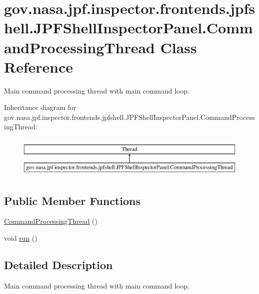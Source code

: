 \hypertarget{classgov_1_1nasa_1_1jpf_1_1inspector_1_1frontends_1_1jpfshell_1_1_j_p_f_shell_inspector_panel_1_1_command_processing_thread}{}\section{gov.\+nasa.\+jpf.\+inspector.\+frontends.\+jpfshell.\+J\+P\+F\+Shell\+Inspector\+Panel.\+Command\+Processing\+Thread Class Reference}
\label{classgov_1_1nasa_1_1jpf_1_1inspector_1_1frontends_1_1jpfshell_1_1_j_p_f_shell_inspector_panel_1_1_command_processing_thread}


Main command processing thread with main command loop.  


Inheritance diagram for gov.\+nasa.\+jpf.\+inspector.\+frontends.\+jpfshell.\+J\+P\+F\+Shell\+Inspector\+Panel.\+Command\+Processing\+Thread\+:\begin{figure}[H]
\begin{center}
\leavevmode
\includegraphics[height=2.000000cm]{classgov_1_1nasa_1_1jpf_1_1inspector_1_1frontends_1_1jpfshell_1_1_j_p_f_shell_inspector_panel_1_1_command_processing_thread}
\end{center}
\end{figure}
\subsection*{Public Member Functions}
\begin{DoxyCompactItemize}
\item 
\hyperlink{classgov_1_1nasa_1_1jpf_1_1inspector_1_1frontends_1_1jpfshell_1_1_j_p_f_shell_inspector_panel_1_1_command_processing_thread_a664c67146d8035044cc984e4de10c084}{Command\+Processing\+Thread} ()
\item 
void \hyperlink{classgov_1_1nasa_1_1jpf_1_1inspector_1_1frontends_1_1jpfshell_1_1_j_p_f_shell_inspector_panel_1_1_command_processing_thread_ad2cf8d6f2369d50d3059e1d1bea8c522}{run} ()
\end{DoxyCompactItemize}


\subsection{Detailed Description}
Main command processing thread with main command loop. 

